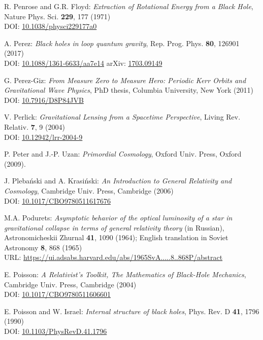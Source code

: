 \begin{thebibliography}{123}
R. Penrose and G.R. Floyd: {\em Extraction of Rotational Energy from
a Black Hole},  Nature Phys. Sci. {\bf 229}, 177 (1971)\\
DOI: \href{https://doi.org/10.1038/physci229177a0}{10.1038/physci229177a0}

A. Perez:
{\em Black holes in loop quantum gravity},
Rep. Prog. Phys. {\bf 80}, 126901 (2017)\\
DOI: \href{https://doi.org/10.1088/1361-6633/aa7e14}{10.1088/1361-6633/aa7e14}\hfill
arXiv: \href{https://arxiv.org/abs/1703.09149}{1703.09149}

G. Perez-Giz: {\em From Measure Zero to Measure Hero:
Periodic Kerr Orbits and Gravitational Wave Physics},
PhD thesis, Columbia University, New York (2011)\\
DOI: \href{https://doi.org/10.7916/D8P84JVB}{10.7916/D8P84JVB}

V. Perlick:
{\em Gravitational Lensing from a Spacetime Perspective},
Living Rev. Relativ. {\bf 7}, 9 (2004)\\
DOI: \href{https://doi.org/10.12942/lrr-2004-9}{10.12942/lrr-2004-9}

P. Peter and J.-P. Uzan: {\em Primordial Cosmology},
Oxford Univ. Press, Oxford (2009).

J. Pleba\'nski and A. Krasi\'nski:
{\em An Introduction to General Relativity and Cosmology},
Cambridge Univ. Press, Cambridge (2006)\\
DOI: \href{https://doi.org/10.1017/CBO9780511617676}{10.1017/CBO9780511617676}

M.A. Podurets:
{\em Asymptotic behavior of the optical luminosity of a star in gravitational collapse
in terms of general relativity theory}
(in Russian),
Astronomicheskii Zhurnal {\bf 41}, 1090 (1964);
English translation in Soviet Astronomy {\bf 8}, 868 (1965)\\
URL: \url{https://ui.adsabs.harvard.edu/abs/1965SvA.....8..868P/abstract}

E. Poisson: \emph{A Relativist's Toolkit,
The Mathematics of Black-Hole Mechanics},
Cambridge Univ. Press, Cambridge (2004) \\
DOI: \href{https://doi.org/10.1017/CBO9780511606601}{10.1017/CBO9780511606601}

E. Poisson and W. Israel: {\em Internal structure of black holes},
Phys. Rev. D {\bf 41}, 1796 (1990) \\
DOI: \href{https://doi.org/10.1103/PhysRevD.41.1796}{10.1103/PhysRevD.41.1796}


\end{thebibliography}
